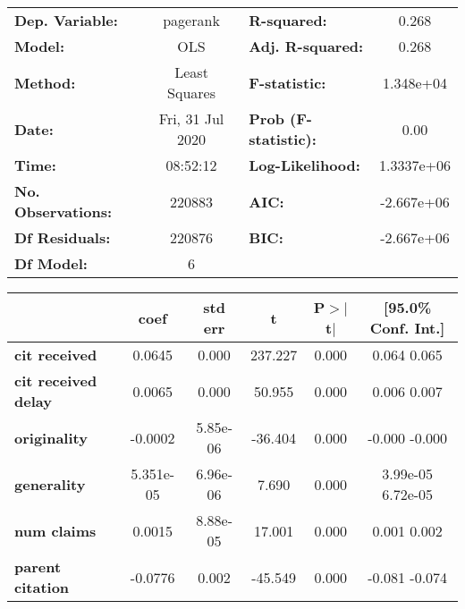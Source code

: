 \begin{center}
\begin{tabular}{lclc}
\toprule
\textbf{Dep. Variable:}     &     pagerank     & \textbf{  R-squared:         } &       0.268    \\
\textbf{Model:}             &       OLS        & \textbf{  Adj. R-squared:    } &       0.268    \\
\textbf{Method:}            &  Least Squares   & \textbf{  F-statistic:       } &   1.348e+04    \\
\textbf{Date:}              & Fri, 31 Jul 2020 & \textbf{  Prob (F-statistic):} &       0.00     \\
\textbf{Time:}              &     08:52:12     & \textbf{  Log-Likelihood:    } &   1.3337e+06   \\
\textbf{No. Observations:}  &      220883      & \textbf{  AIC:               } &   -2.667e+06   \\
\textbf{Df Residuals:}      &      220876      & \textbf{  BIC:               } &   -2.667e+06   \\
\textbf{Df Model:}          &           6      & \textbf{                     } &                \\
\bottomrule
\end{tabular}
\begin{tabular}{lccccc}
                            & \textbf{coef} & \textbf{std err} & \textbf{t} & \textbf{P$>$$|$t$|$} & \textbf{[95.0\% Conf. Int.]}  \\
\midrule
\textbf{cit received}       &       0.0645  &        0.000     &   237.227  &         0.000        &         0.064     0.065       \\
\textbf{cit received delay} &       0.0065  &        0.000     &    50.955  &         0.000        &         0.006     0.007       \\
\textbf{originality}        &      -0.0002  &     5.85e-06     &   -36.404  &         0.000        &        -0.000    -0.000       \\
\textbf{generality}         &    5.351e-05  &     6.96e-06     &     7.690  &         0.000        &      3.99e-05  6.72e-05       \\
\textbf{num claims}         &       0.0015  &     8.88e-05     &    17.001  &         0.000        &         0.001     0.002       \\
\textbf{parent citation}    &      -0.0776  &        0.002     &   -45.549  &         0.000        &        -0.081    -0.074       \\

\end{tabular}
\end{center}
